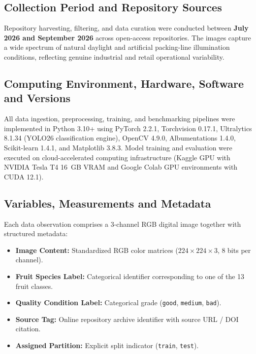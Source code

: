 \documentclass[11pt,a4paper]{article}
\begin{document}
\subsection{Collection Period and Repository Sources}
Repository harvesting, filtering, and data curation were conducted between \textbf{July 2026 and September 2026} across open-access repositories. The images capture a wide spectrum of natural daylight and artificial packing-line illumination conditions, reflecting genuine industrial and retail operational variability.

\subsection{Computing Environment, Hardware, Software and Versions}
All data ingestion, preprocessing, training, and benchmarking pipelines were implemented in Python 3.10+ using PyTorch 2.2.1, Torchvision 0.17.1, Ultralytics 8.1.34 (YOLO26 classification engine), OpenCV 4.9.0, Albumentations 1.4.0, Scikit-learn 1.4.1, and Matplotlib 3.8.3. Model training and evaluation were executed on cloud-accelerated computing infrastructure (Kaggle GPU with NVIDIA Tesla T4 16~GB VRAM and Google Colab GPU environments with CUDA 12.1).

\subsection{Variables, Measurements and Metadata}
Each data observation comprises a 3-channel RGB digital image together with structured metadata:
\begin{itemize}
    \item \textbf{Image Content:} Standardized RGB color matrices ($224 \times 224 \times 3$, 8 bits per channel).
    \item \textbf{Fruit Species Label:} Categorical identifier corresponding to one of the 13 fruit classes.
    \item \textbf{Quality Condition Label:} Categorical grade (\texttt{good}, \texttt{medium}, \texttt{bad}).
    \item \textbf{Source Tag:} Online repository archive identifier with source URL / DOI citation.
    \item \textbf{Assigned Partition:} Explicit split indicator (\texttt{train}, \texttt{test}).
\end{itemize}
\end{document}
